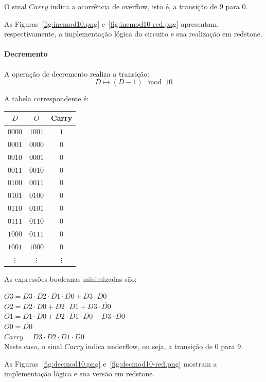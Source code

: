 O sinal $Carry$ indica a ocorrência de overflow, isto é, a transição de $9$ para $0$.

As Figuras~\ref{fig:incmod10.png} e~\ref{fig:incmod10-red.png} apresentam, respectivamente, a implementação lógica do circuito e sua realização em redstone.


\paragraph{Decremento}

A operação de decremento realiza a transição:
\[
D \mapsto (D - 1) \mod 10
\]

A tabela correspondente é:

\begin{center}
\begin{tabular}{c|cc}
$D$ & $O$ & Carry \\
\hline
$0000$ & $1001$ & $1$ \\
$0001$ & $0000$ & $0$ \\
$0010$ & $0001$ & $0$ \\
$0011$ & $0010$ & $0$ \\
$0100$ & $0011$ & $0$ \\
$0101$ & $0100$ & $0$ \\
$0110$ & $0101$ & $0$ \\
$0111$ & $0110$ & $0$ \\
$1000$ & $0111$ & $0$ \\
$1001$ & $1000$ & $0$ \\
$\vdots$ & $\vdots$ & $\vdots$ \\
\end{tabular}
\end{center}

As expressões booleanas minimizadas são:

$O3 =  \overline{D3}  \cdot  \overline{D2}  \cdot  \overline{D1}  \cdot  \overline{D0} +D3 \cdot D0$~\\
$O2 = D2 \cdot D0+D2 \cdot D1+D3 \cdot  \overline{D0} $~\\
$O1 = D1 \cdot D0+D2 \cdot  \overline{D1}  \cdot  \overline{D0} +D3 \cdot  \overline{D0} $~\\
$O0 =  \overline{D0} $~\\
$Carry =  \overline{D3}  \cdot  \overline{D2}  \cdot  \overline{D1}  \cdot  \overline{D0} $~\\

Neste caso, o sinal $Carry$ indica underflow, ou seja, a transição de $0$ para $9$.

As Figuras~\ref{fig:decmod10.png} e~\ref{fig:decmod10-red.png} mostram a implementação lógica e sua versão em redstone.

